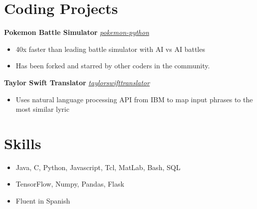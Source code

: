 \documentclass[10pt,letterpaper]{article}
\begin{document}
\section*{Coding Projects} \hrulefill 

\textbf{Pokemon Battle Simulator} \hfill {} \href{https://github.com/nicolaslindbloomairey/pokemon-python}{\textit{pokemon-python}}
\begin{itemize}
    \item 40x faster than leading battle simulator with AI vs AI battles
    \item Has been forked and starred by other coders in the community.
\end{itemize}

\textbf{Taylor Swift Translator} \hfill {} \href{https://github.com/nicolaslindbloomairey/taylorswifttranslator}{\textit{taylorswifttranslator}}
\begin{itemize}
    \item Uses natural language processing API from IBM to map input phrases to the most similar lyric
\end{itemize}
%
%
\section*{Skills} \hrulefill 
\begin{itemize}
    \item Java, C, Python, Javascript, Tcl, MatLab, Bash, SQL
    \item TensorFlow, Numpy, Pandas, Flask
    \item Fluent in Spanish
\end{itemize}
\end{document}
